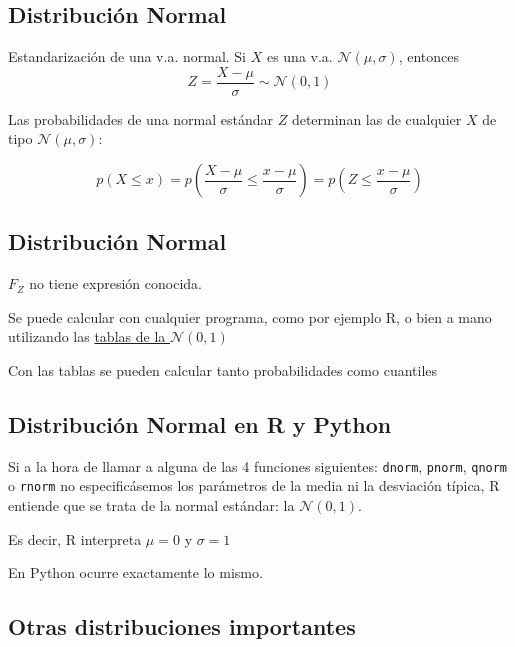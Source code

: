 \documentclass[
]{article}
\begin{document}
\hypertarget{distribuciuxf3n-normal-4}{%
\subsection{Distribución Normal}\label{distribuciuxf3n-normal-4}}

Estandarización de una v.a. normal. Si \(X\) es una v.a.
\(\mathcal{N}(\mu,\sigma)\), entonces
\[Z=\frac{X-\mu}{\sigma}\sim\mathcal{N}(0,1)\]

Las probabilidades de una normal estándar \(Z\) determinan las de
cualquier \(X\) de tipo \(\mathcal{N}(\mu,\sigma)\):

\[p(X\le x)=p\left(\frac{X-\mu}{\sigma}\le\frac{x-\mu}{\sigma}\right)=p\left(Z\le\frac{x-\mu}{\sigma}\right)\]

\hypertarget{distribuciuxf3n-normal-5}{%
\subsection{Distribución Normal}\label{distribuciuxf3n-normal-5}}

\(F_Z\) no tiene expresión conocida.

Se puede calcular con cualquier programa, como por ejemplo R, o bien a
mano utilizando las
\href{https://github.com/joanby/r-basic/blob/master/teoria/TablaNormal.pdf}{tablas
de la \(\mathcal{N}(0,1)\)}

Con las tablas se pueden calcular tanto probabilidades como cuantiles

\hypertarget{distribuciuxf3n-normal-en-r-y-python}{%
\subsection{Distribución Normal en R y
Python}\label{distribuciuxf3n-normal-en-r-y-python}}

Si a la hora de llamar a alguna de las 4 funciones siguientes:
\texttt{dnorm}, \texttt{pnorm}, \texttt{qnorm} o \texttt{rnorm} no
especificásemos los parámetros de la media ni la desviación típica, R
entiende que se trata de la normal estándar: la \(\mathcal{N}(0,1)\).

Es decir, R interpreta \(\mu = 0\) y \(\sigma = 1\)

En Python ocurre exactamente lo mismo.

\hypertarget{otras-distribuciones-importantes}{%
\subsection{Otras distribuciones
importantes}\label{otras-distribuciones-importantes}}
\end{document}
